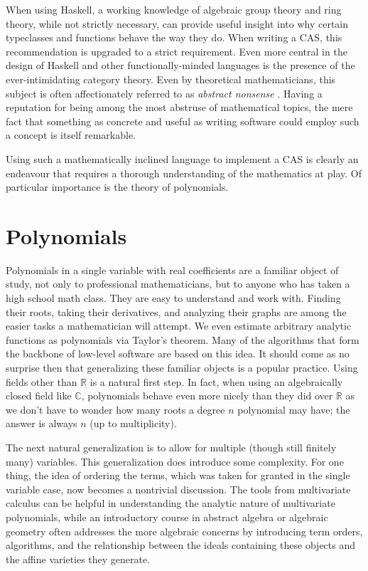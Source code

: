 \documentclass[MS, xcolor=dvipsnames]{wfuthesis}
\def\bC{\mathbb{C}}
\def\bR{\mathbb{R}}
\theoremstyle{definition}
\begin{document}
When using Haskell, a working knowledge of algebraic group theory and ring theory, while not strictly necessary, can provide useful insight into why certain typeclasses and functions behave the way they do. When writing a CAS, this recommendation is upgraded to a strict requirement. Even more central in the design of Haskell and other functionally-minded languages is the presence of the ever-intimidating category theory. Even by theoretical mathematicians, this subject is often affectionately referred to as \textit{abstract nonsense} \cite{Saunders1997}. Having a reputation for being among the most abstruse of mathematical topics, the mere fact that something as concrete and useful as writing software could employ such a concept is itself remarkable. \par
Using such a mathematically inclined language to implement a CAS is clearly an endeavour that requires a thorough understanding of the mathematics at play. Of particular importance is the theory of polynomials.


\section{Polynomials}
Polynomials in a single variable with real coefficients are a familiar object of study, not only to professional mathematicians, but to anyone who has taken a high school math class. They are easy to understand and work with. Finding their roots, taking their derivatives, and analyzing their graphs are among the easier tasks a mathematician will attempt. We even estimate arbitrary analytic functions as polynomials via Taylor's theorem. Many of the algorithms that form the backbone of low-level software are based on this idea. It should come as no surprise then that generalizing these familiar objects is a popular practice. Using fields other than $\bR$ is a natural first step. In fact, when using an algebraically closed field like $\bC$, polynomials behave even more nicely than they did over $\bR$ as we don't have to wonder how many roots a degree $n$ polynomial may have; the answer is always $n$ (up to multiplicity). \par
The next natural generalization is to allow for multiple (though still finitely many) variables. This generalization does introduce some complexity. For one thing, the idea of ordering the terms, which was taken for granted in the single variable case, now becomes a nontrivial discussion. The tools from multivariate calculus can be helpful in understanding the analytic nature of multivariate polynomials, while an introductory course in abstract algebra or algebraic geometry often addresses the more algebraic concerns by introducing term orders, algorithms, and the relationship between the ideals containing these objects and the affine varieties they generate.
\end{document}
